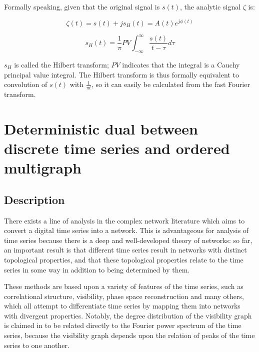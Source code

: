 \documentclass[12pt]{article}
\begin{document}
Formally speaking, given that the original signal is $s(t)$, the analytic signal $\zeta$ is:

$$\zeta(t) = s(t) + js_H(t) = A(t)e^{j\phi(t)}$$

$$s_H(t) = \frac{1}{\pi} PV \int_{-\infty}^{\infty} \frac{s(t)}{t - \tau} d\tau$$

$s_H$ is called the Hilbert transform; $PV$ indicates that the integral is a Cauchy principal value integral. The Hilbert transform is thus formally equivalent to convolution of $s(t)$ with $\frac{1}{\pi t}$, so it can easily be calculated from the fast Fourier transform.


\section{Deterministic dual between discrete time series and ordered multigraph}

\subsection{Description}

There exists a line of analysis in the complex network literature which aims to convert a digital time series into a network. This is advantageous for analysis of time series because there is a deep and well-developed theory of networks: so far, an important result is that different time series result in networks with distinct topological properties, and that these topological properties relate to the time series in some way in addition to being determined by them\cite{campanharo}.

These methods are based upon a variety of features of the time series, such as correlational structure\cite{correlationgraph}, visibility\cite{lacasa}, phase space reconstruction\cite{phasespacegraph} and many others, which all attempt to differentiate time series by mapping them into networks with divergent properties. Notably, the degree distribution of the visibility graph is claimed in \cite{lacasa} to be related directly to the Fourier power spectrum of the time series, because the visibility graph depends upon the relation of peaks of the time series to one another.
\end{document}
